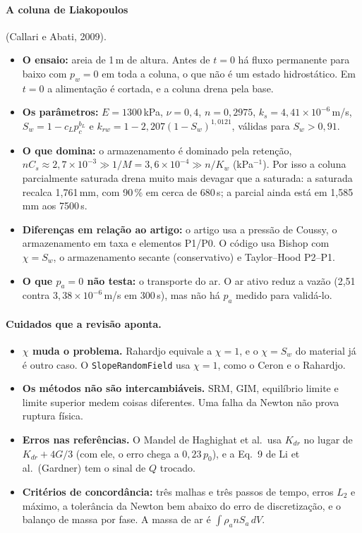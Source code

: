 \paragraph{A coluna de Liakopoulos} (Callari e Abati, 2009).
\begin{itemize}
  \item \textbf{O ensaio:} areia de 1\,m de altura. Antes de $t = 0$ há fluxo permanente para baixo com $p_w = 0$ em
    toda a coluna, o que não é um estado hidrostático. Em $t = 0$ a alimentação é cortada, e a coluna drena pela base.
  \item \textbf{Os parâmetros:} $E = 1300$\,kPa, $\nu = 0{,}4$, $n = 0{,}2975$, $k_s = 4{,}41\times10^{-6}$\,m/s,
    $S_w = 1 - c_L p_c^{b_L}$ e $k_{rw} = 1 - 2{,}207(1 - S_w)^{1{,}0121}$, válidas para $S_w > 0{,}91$.
  \item \textbf{O que domina:} o armazenamento é dominado pela retenção,
    $nC_s \approx 2{,}7\times10^{-3} \gg 1/M = 3{,}6\times10^{-4} \gg n/K_w$ (kPa$^{-1}$). Por isso a coluna parcialmente
    saturada drena muito mais devagar que a saturada: a saturada recalca 1,761\,mm, com 90\,\% em cerca de 680\,s; a
    parcial ainda está em 1,585\,mm aos 7500\,s.
  \item \textbf{Diferenças em relação ao artigo:} o artigo usa a pressão de Coussy, o armazenamento em taxa e elementos
    P1/P0. O código usa Bishop com $\chi = S_w$, o armazenamento secante (conservativo) e Taylor--Hood P2--P1.
  \item \textbf{O que $p_a = 0$ não testa:} o transporte do ar. O ar ativo reduz a vazão (2,51 contra
    $3{,}38\times10^{-6}$\,m/s em 300\,s), mas não há $p_a$ medido para validá-lo.
\end{itemize}

\paragraph{Cuidados que a revisão aponta.}
\begin{itemize}
  \item \textbf{$\chi$ muda o problema.} Rahardjo equivale a $\chi = 1$, e o $\chi = S_w$ do material já é outro caso.
    O \texttt{SlopeRandomField} usa $\chi = 1$, como o Ceron e o Rahardjo.
  \item \textbf{Os métodos não são intercambiáveis.} SRM, GIM, equilíbrio limite e limite superior medem coisas
    diferentes. Uma falha da Newton não prova ruptura física.
  \item \textbf{Erros nas referências.} O Mandel de Haghighat et al.\ usa $K_{dr}$ no lugar de $K_{dr} + 4G/3$ (com ele,
    o erro chega a $0{,}23\,p_0$), e a Eq.\ 9 de Li et al.\ (Gardner) tem o sinal de $Q$ trocado.
  \item \textbf{Critérios de concordância:} três malhas e três passos de tempo, erros $L_2$ e máximo, a tolerância da
    Newton bem abaixo do erro de discretização, e o balanço de massa por fase. A massa de ar é
    $\int \rho_a n S_a\, dV$.
\end{itemize}

